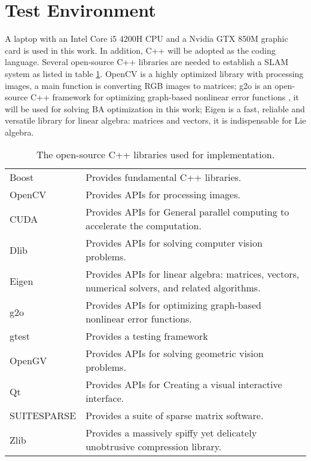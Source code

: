 \section{Test Environment}
\label{sec:Test_Environment}
A laptop with an Intel Core i5 4200H CPU and a Nvidia GTX 850M graphic card is used in this work. In addition, C++ will be adopted as the coding language. Several open-source C++ libraries are needed to establish a \ac{SLAM} system as listed in table \ref{Open_Source_Libraries}. OpenCV \parencite{website:OpenCV} is a highly optimized library with processing images, a main function is converting RGB images to matrices; g2o is an open-source C++ framework for optimizing graph-based nonlinear error functions \parencite{website:g2o}, it will be used for solving \ac{BA} optimization in this work; Eigen \parencite{website:Eigen} is a fast, reliable and versatile library for linear algebra: matrices and vectors, it is indispensable for Lie algebra.
\begin{table}[htb]
    \caption{The open-source C++ libraries used for implementation.}
    \centering
    \begin{tabular}{p{4cm}|p{9cm}}
        \toprule
        Boost\parencite{website:Boost} &Provides fundamental C++ libraries.\\
        OpenCV\parencite{website:OpenCV} &Provides APIs for processing images.\\
        CUDA\parencite{website:CUDA} &Provides APIs for General parallel computing to accelerate the computation.\\
        Dlib\parencite{website:DLib} &Provides APIs for solving computer vision problems.\\
        Eigen\parencite{website:Eigen} &Provides APIs for linear algebra: matrices, vectors, numerical solvers, and related algorithms.\\
        g2o\parencite{website:g2o} &Provides APIs for optimizing graph-based nonlinear error functions.\\
        gtest\parencite{website:GTest} &Provides a testing framework\\
        OpenGV\parencite{website:OpenGV} &Provides APIs for solving
        geometric vision problems.\\
        Qt\parencite{website:Qt} &Provides APIs for Creating a visual interactive interface.\\
        SUITESPARSE\parencite{website:SUITESPARSE} &Provides a suite of sparse matrix software.\\
        Zlib\parencite{website:Zlib} &Provides a massively spiffy yet delicately unobtrusive compression library.\\
        \bottomrule
    \end{tabular}
    \label{Open_Source_Libraries}
\end{table}

